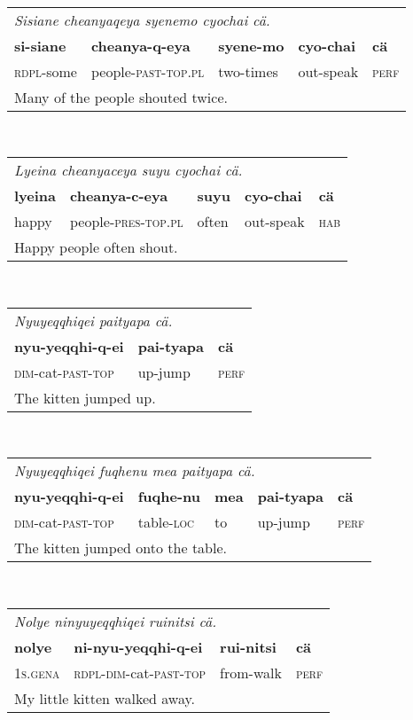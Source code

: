 \documentclass{article}
\begin{document}
\\[0.5cm]
\begin{tabular}{l l l l l}
\multicolumn{5}{l}{\emph{Sisiane cheanyaqeya syenemo cyochai c\"a.}} \\
\textbf{si-siane} & \textbf{cheanya-q-eya} & \textbf{syene-mo} & \textbf{cyo-chai} & \textbf{c\"a} \\
\textsc{rdpl}-some & people-\textsc{past-top.pl} & two-times & out-speak & \textsc{perf} \\
\multicolumn{5}{l}{Many of the people shouted twice.} \\
\end{tabular}
\\[0.5cm]
\begin{tabular}{l l l l l}
\multicolumn{5}{l}{\emph{Lyeina cheanyaceya suyu cyochai c\"a.}} \\
\textbf{lyeina} & \textbf{cheanya-c-eya} & \textbf{suyu} & \textbf{cyo-chai} & \textbf{c\"a} \\
happy & people-\textsc{pres-top.pl} & often & out-speak & \textsc{hab} \\
\multicolumn{5}{l}{Happy people often shout.} \\
\end{tabular}
\\[0.5cm]
\begin{tabular}{l l l}
\multicolumn{3}{l}{\emph{Nyuyeqqhiqei paityapa c\"a.}} \\
\textbf{nyu-yeqqhi-q-ei} & \textbf{pai-tyapa} & \textbf{c\"a} \\
\textsc{dim}-cat-\textsc{past-top} & up-jump & \textsc{perf} \\
\multicolumn{3}{l}{The kitten jumped up.} \\
\end{tabular}
\\[0.5cm]
\begin{tabular}{l l l l l}
\multicolumn{5}{l}{\emph{Nyuyeqqhiqei fuqhenu mea paityapa c\"a.}} \\
\textbf{nyu-yeqqhi-q-ei} & \textbf{fuqhe-nu} & \textbf{mea} & \textbf{pai-tyapa} & \textbf{c\"a} \\
\textsc{dim}-cat-\textsc{past-top} & table-\textsc{loc} & to & up-jump & \textsc{perf} \\
\multicolumn{5}{l}{The kitten jumped onto the table.} \\
\end{tabular}
\\[0.5cm]
\begin{tabular}{l l l l}
\multicolumn{4}{l}{\emph{Nolye ninyuyeqqhiqei ruinitsi c\"a.}} \\
\textbf{nolye} & \textbf{ni-nyu-yeqqhi-q-ei} & \textbf{rui-nitsi} & \textbf{c\"a} \\
\textsc{1s.gena} & \textsc{rdpl-dim}-cat-\textsc{past-top} & from-walk & \textsc{perf} \\
\multicolumn{4}{l}{My little kitten walked away.} \\
\end{tabular}
\end{document}
